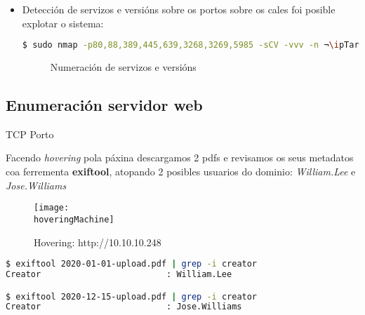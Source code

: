 \documentclass[a4paper]{article}
\newcommand{\nmapTargeted}{nmap_intelligence_targeted.png}
\newcommand{\hoveringMachine}{hovering_intelligence.png}
\newcommand{\ipTarget}{10.10.10.248}
\begin{document}
\begin{itemize}
        \clearpage
        \item Detección de servizos e versións sobre os portos sobre os cales foi posible explotar o sistema:

        \begin{lstlisting}[language=Bash, caption=nmap scripting sobre servizos e versións]
$ sudo nmap -p80,88,389,445,639,3268,3269,5985 -sCV -vvv -n ¬\ipTarget¬
        \end{lstlisting}
         \begin{figure}[h]
                \begin{center}
                \caption{Numeración de servizos e versións}
                \label{fig:servicesResults}
                \end{center}
        \end{figure}

        \end{itemize}
        \subsection{Enumeración servidor web}
        \vspace{0.2cm}

        \begin{schema}{TCP}
        Porto
        \end{schema}
 
        Facendo \textit{hovering} pola páxina descargamos 2 pdfs e revisamos os seus metadatos coa ferrementa \textbf{exiftool}, atopando 2 posibles usuarios do dominio: \textit{William.Lee} e \textit{Jose.Williams}

        \begin{figure}[h]
                \centering
                \texttt{[image: \\hoveringMachine]}
                \caption{Hovering: http://\ipTarget}
        \end{figure}


        \begin{lstlisting}[language=Bash, caption=Metadatos: exiftool]
$ exiftool 2020-01-01-upload.pdf | grep -i creator
Creator                         : William.Lee

$ exiftool 2020-12-15-upload.pdf | grep -i creator
Creator                         : Jose.Williams\end{lstlisting}

        \clearpage
\end{document}
